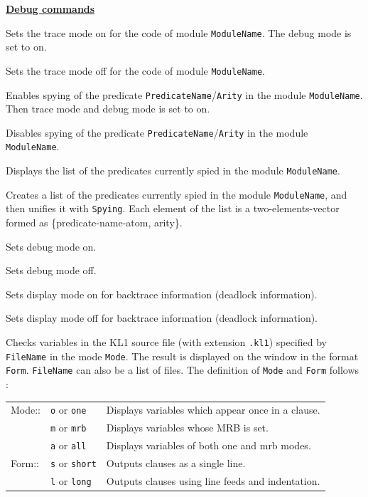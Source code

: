 \noindent\underline{\bf Debug commands}
\vspace{1ex}\par
\begin{itemize}

Sets the trace mode on for the code of module \verb|ModuleName|.
The debug mode is set to on.

Sets the trace mode off for the code of module \verb|ModuleName|.

Enables spying of the predicate \verb|PredicateName|/\verb|Arity|
in the module \verb|ModuleName|. Then trace mode and debug mode is set to on.

Disables spying of the predicate \verb|PredicateName|/\verb|Arity|
 in the module \verb|ModuleName|.

Displays the list of the predicates
currently spied in the module \verb|ModuleName|.

Creates a list of the predicates currently spied in 
the module \verb|ModuleName|, and then unifies it 
with \verb|Spying|. Each element of the list is a two-elements-vector formed
as \{predicate-name-atom, arity\}.

Sets debug mode on.

Sets debug mode off.

Sets display mode on for backtrace information (deadlock information).

Sets display mode off for backtrace information (deadlock information).

Checks variables in the KL1 source file (with extension \verb|.kl1|) specified 
by \verb|FileName| in the mode \verb|Mode|.
The result is displayed on the window 
in the format \verb|Form|. \verb|FileName| can also be a list of files.
The definition of \verb|Mode| and \verb|Form| follows :

\vspace{1ex}
\hspace*{15mm}\begin{tabular}{ll@{ $\cdots$ }l} 
Mode:: & \verb|o| or \verb|one|   
		& Displays variables which appear once in a clause.\\
       & \verb|m| or \verb|mrb|   & Displays variables whose MRB is set.\\
       & \verb|a| or \verb|all|   
		& Displays variables of both one and mrb modes.\\
Form:: & \verb|s| or \verb|short|     & Outputs clauses as a single line.\\
       & \verb|l| or \verb|long|      
		& Outputs clauses using line feeds and indentation.\\
\end{tabular}
\vspace{1ex}


\end{itemize}

